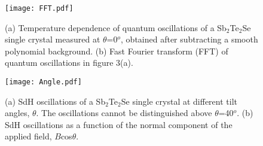 \documentclass[aps,prb,twocolumn,showpacs,groupedaddress]{revtex4-1}
\begin{document}
\begin{figure}
  \centering
  \texttt{[image: FFT.pdf]}
  \caption{(a) Temperature dependence of quantum oscillations of a Sb$_2$Te$_2$Se single crystal measured at $\theta$=0$^{o}$, obtained after subtracting a smooth polynomial background. (b) Fast Fourier transform (FFT) of quantum oscillations in figure 3(a).}\label{FFT}
\end{figure}
\begin{figure}
  \centering
  \texttt{[image: Angle.pdf]}
  \caption{(a) SdH oscillations of a Sb$_2$Te$_2$Se single crystal at different tilt angles, $\theta$. The oscillations cannot be distinguished above $\theta$=40$^{o}$. (b) SdH oscillations as a function of the normal component of the applied field, $B$cos$\theta$.}\label{Angle}
\end{figure}
\end{document}

